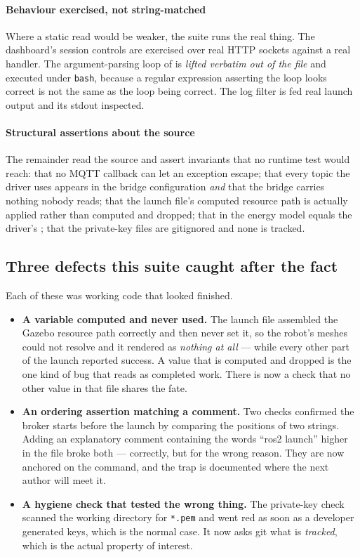 \paragraph{Behaviour exercised, not string-matched} Where a static read
would be weaker, the suite runs the real thing. The dashboard's session
controls are exercised over real HTTP sockets against a real handler.
The argument-parsing loop of  is \emph{lifted
verbatim out of the file} and executed under \texttt{bash}, because a
regular expression asserting the loop looks correct is not the same as
the loop being correct. The log filter is fed real launch output and its
stdout inspected.

\paragraph{Structural assertions about the source} The remainder read
the source and assert invariants that no runtime test would reach: that
no MQTT callback can let an exception escape; that every topic the
driver uses appears in the bridge configuration \emph{and} that the
bridge carries nothing nobody reads; that the launch file's computed
resource path is actually applied rather than computed and dropped; that
 in the energy model equals the driver's
; that the private-key files are gitignored and none is
tracked.

\subsection{Three defects this suite caught after the fact}

Each of these was working code that looked finished.

\begin{itemize}[leftmargin=*,itemsep=2pt,topsep=3pt]
  \item \textbf{A variable computed and never used.} The launch file
        assembled the Gazebo resource path correctly and then never set
        it, so the robot's meshes could not resolve and it rendered as
        \emph{nothing at all} --- while every other part of the launch
        reported success. A value that is computed and dropped is the
        one kind of bug that reads as completed work. There is now a
        check that no other value in that file shares the fate.
  \item \textbf{An ordering assertion matching a comment.} Two checks
        confirmed the broker starts before the launch by comparing the
        positions of two strings. Adding an explanatory comment
        containing the words ``ros2 launch'' higher in the file broke
        both --- correctly, but for the wrong reason. They are now
        anchored on the command, and the trap is documented where the
        next author will meet it.
  \item \textbf{A hygiene check that tested the wrong thing.} The
        private-key check scanned the working directory for
        \texttt{*.pem} and went red as soon as a developer generated
        keys, which is the normal case. It now asks git what is
        \emph{tracked}, which is the actual property of interest.
\end{itemize}

